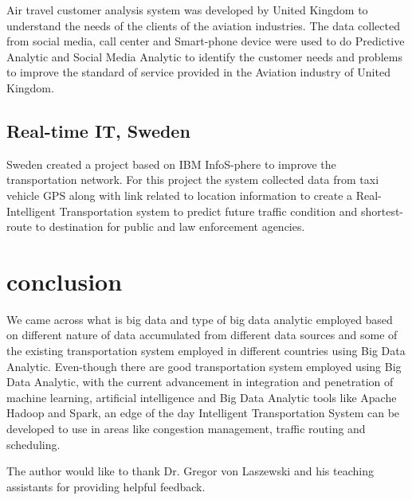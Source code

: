 \documentclass[sigconf]{acmart}
\begin{document}
Air travel customer analysis system\cite{bdlt} was developed by United Kingdom to understand the needs of the clients of the aviation industries. The data collected from social media, call center and Smart-phone device were used to do Predictive Analytic and Social Media Analytic to identify the customer needs and problems to improve the standard of service provided in the Aviation industry of United Kingdom.

\subsection{Real-time IT, Sweden}

Sweden created a project based on IBM InfoS-phere\cite{bdlt} to improve the transportation network. For this project the system collected data from taxi vehicle GPS along with link related to location information to create a Real-Intelligent Transportation system to predict future traffic condition and shortest-route to destination for public and law enforcement agencies.


\section{conclusion}

We came across what is big data and type of big data analytic employed based on different nature of data accumulated from different data sources and some of the existing transportation system employed in different countries using Big Data Analytic. Even-though there are good transportation system employed using Big Data Analytic, with the current advancement in integration and penetration of machine learning, artificial intelligence and Big Data Analytic tools like Apache Hadoop and Spark, an edge of the day Intelligent Transportation System can be developed to use in areas like congestion management, traffic routing and scheduling.

\begin{acks}

The author would like to thank Dr. Gregor von Laszewski and his teaching assistants for providing helpful feedback.
\end{acks}


 
\end{document}
